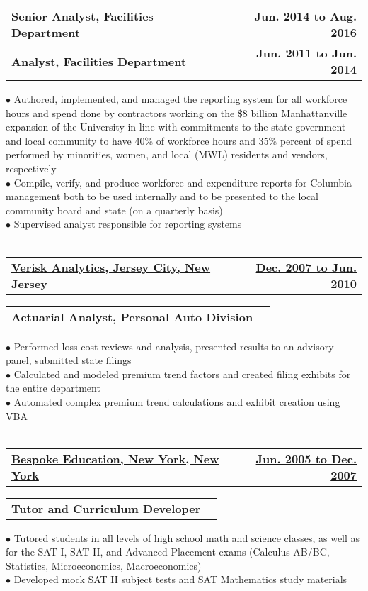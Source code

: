 \documentclass{article}
\begin{document}
			\begin{tabular*}{\textwidth}{@{\extracolsep{\fill}}lr}
				\textbf{Senior Analyst, Facilities Department} & \textbf{Jun. 2014 to Aug. 2016} \\
				\textbf{Analyst, Facilities Department} & \textbf{Jun. 2011 to Jun. 2014}
			\end{tabular*}
			$\bullet$ Authored, implemented, and managed the reporting system for all workforce hours and spend done by contractors working on the \$8 billion Manhattanville expansion of the University in line with commitments to the state government and local community to have 40\% of workforce hours and 35\% percent of spend performed by minorities, women, and local (MWL) residents and vendors, respectively \\
			$\bullet$ Compile, verify, and produce workforce and expenditure reports for Columbia management both to be used internally and to be presented to the local community board and state (on a quarterly basis) \\
			$\bullet$ Supervised analyst responsible for reporting systems \\ \\
		\begin{tabular*}{\textwidth}{@{\extracolsep{\fill}}lr}
			\textbf{\underline{Verisk Analytics, Jersey City, New Jersey}} & \textbf{\underline{Dec. 2007 to Jun. 2010}}  \\
		\end{tabular*}
			\begin{tabular*}{\textwidth}{@{\extracolsep{\fill}}lr}
				\textbf{Actuarial Analyst, Personal Auto Division}
			\end{tabular*}
			$\bullet$ Performed loss cost reviews and analysis, presented results to an advisory panel, submitted state filings \\
			$\bullet$ Calculated and modeled premium trend factors and created filing exhibits for the entire department \\
			$\bullet$ Automated complex premium trend calculations and exhibit creation using VBA \\ \\
		\begin{tabular*}{\textwidth}{@{\extracolsep{\fill}}lr}
			\textbf{\underline{Bespoke Education, New York, New York}} & \textbf{\underline{Jun. 2005 to Dec. 2007}}  \\
		\end{tabular*}
			\begin{tabular*}{\textwidth}{@{\extracolsep{\fill}}lr}
				\textbf{Tutor and Curriculum Developer}
			\end{tabular*}
			$\bullet$ Tutored students in all levels of high school math and science classes, as well as for the SAT I, SAT II, and Advanced Placement exams (Calculus AB/BC, Statistics, Microeconomics, Macroeconomics) \\
			$\bullet$ Developed mock SAT II subject tests and SAT Mathematics study materials				
\end{document}
